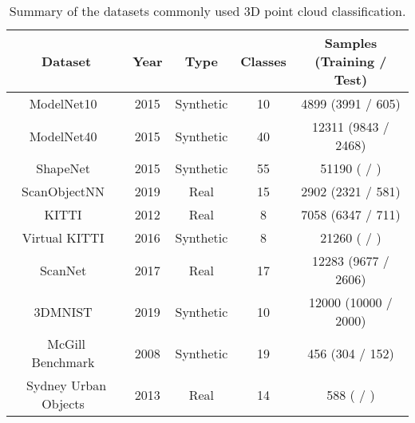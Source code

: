 \documentclass{ieeeaccess}
\begin{document}
\begin{table*}
\caption{
{ Summary of the datasets commonly used 3D point cloud classification.
}}
\centering
\begin{tabular}{ c  c  c  c  c }
\toprule
\bf Dataset & \bf Year & \bf Type & \bf Classes & \bf Samples (Training / Test) \\
\midrule
ModelNet10~\cite{wu20153d} & 2015 & Synthetic & 10 & 4899 (3991 / 605)\\

ModelNet40~\cite{wu20153d} & 2015 & Synthetic & 40 & 12311 (9843 / 2468)\\

ShapeNet~\cite{chang2015shapenet} & 2015 & Synthetic & 55 & 51190 ( / ) \\

ScanObjectNN~\cite{uy2019revisiting} & 2019 & Real & 15 & 2902 (2321 / 581)\\

KITTI~\cite{geiger2012we} & 2012 & Real & 8 & 7058 (6347 / 711) \\

Virtual KITTI~\cite{gaidon2016virtual} & 2016 & Synthetic & 8 & 21260 ( / ) \\

ScanNet~\cite{dai2017scannet} &2017 & Real & 17 & 12283 (9677 / 2606) \\

3DMNIST~\cite{3Dminst} & 2019 & Synthetic & 10 & 12000 (10000 / 2000) \\

McGill Benchmark~\cite{siddiqi2008retrieving} & 2008 & Synthetic & 19 & 456 (304 / 152) \\

Sydney Urban Objects~\cite{de2013unsupervised} & 2013 & Real & 14 & 588 ( / ) \\
\bottomrule
\end{tabular}
\label{table:datasets}
\end{table*}
\end{document}
